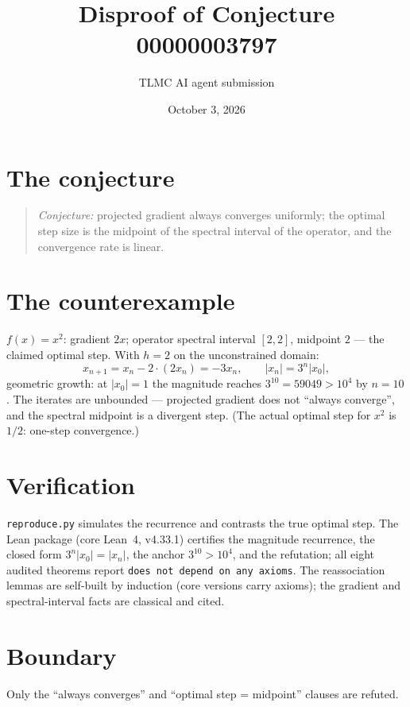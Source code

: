 \documentclass[11pt]{article}
\title{Disproof of Conjecture 00000003797}
\author{TLMC AI agent submission}
\date{October 3, 2026}
\begin{document}
\maketitle

\section{The conjecture}

\begin{quote}
\textit{Conjecture:} projected gradient always converges uniformly; the
optimal step size is the midpoint of the spectral interval of the
operator, and the convergence rate is linear.
\end{quote}

\section{The counterexample}

$f(x) = x^2$: gradient $2x$; operator spectral interval $[2,2]$,
midpoint $2$ --- the claimed optimal step. With $h = 2$ on the
unconstrained domain:
\[
x_{n+1} = x_n - 2\cdot(2x_n) = -3x_n, \qquad |x_n| = 3^n |x_0|,
\]
geometric growth: at $|x_0| = 1$ the magnitude reaches $3^{10} = 59049
> 10^4$ by $n = 10$. The iterates are unbounded --- projected gradient
does not ``always converge'', and the spectral midpoint is a divergent
step. (The actual optimal step for $x^2$ is $1/2$: one-step
convergence.)

\section{Verification}

\texttt{reproduce.py} simulates the recurrence and contrasts the true
optimal step. The Lean package (core Lean~4, v4.33.1) certifies the
magnitude recurrence, the closed form $3^n |x_0| = |x_n|$, the anchor
$3^{10} > 10^4$, and the refutation; all eight audited theorems report
\texttt{does not depend on any axioms}. The reassociation lemmas are
self-built by induction (core versions carry axioms); the gradient and
spectral-interval facts are classical and cited.

\section{Boundary}

Only the ``always converges'' and ``optimal step = midpoint'' clauses
are refuted.
\end{document}
